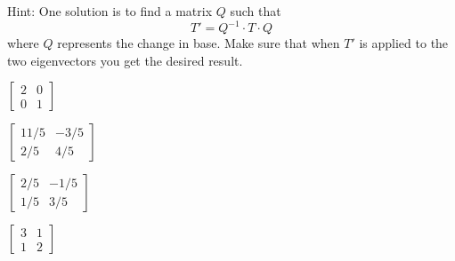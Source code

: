\documentclass{exam}
\begin{document}
Hint: One solution is to find a matrix $Q$ such that $$T' = Q^{-1} \cdot T \cdot Q$$ where $Q$ represents the change in base. Make sure that when $T'$ is applied to the two eigenvectors you get the desired result. \\

\begin{oneparchoices}
  \choice $\begin{bmatrix}
            2 & 0 \\
            0 & 1
          \end{bmatrix}$

  \choice $\begin{bmatrix}
            11/5 & -3/5 \\
            2/5 & 4/5
          \end{bmatrix}$

  \choice $\begin{bmatrix}
            2/5 & -1/5 \\
            1/5 & 3/5
          \end{bmatrix}$

  \choice $\begin{bmatrix}
            3 & 1 \\
            1 & 2
          \end{bmatrix}$
\end{oneparchoices}
\end{document}

